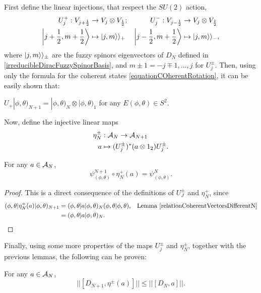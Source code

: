 First define the linear injections, that respect the $SU(2)$ action,
\begin{align*}
    U^+_j : V_{j+\frac{1}{2}} &\to V_j \otimes V_{\frac{1}{2}}; 
    & U^-_j : V_{j-\frac{1}{2}} &\to V_j \otimes V_{\frac{1}{2}} \\
    \left|j + \frac{1}{2}, m + \frac{1}{2}\right\rangle &\mapsto |j, m\rangle\rangle_+ &
    \left|j - \frac{1}{2}, m + \frac{1}{2}\right\rangle &\mapsto |j, m\rangle\rangle_-,
\end{align*} where $|j, m\rangle\rangle_\pm$ are the fuzzy spinors eigenvectors of $D_N$ defined in \ref{irreducibleDiracFuzzySpinorBasis}, and $m \pm 1 = -j \mp 1, \dots, j$ for $U_j^\pm$. 
Then, using only the formula for the coherent states \eqref{equationCOherentRotation}, it can be easily shown that:

\begin{lemma}\label{relationCoherentVectorsDifferentN}
$U_+|\phi, \theta)_{N+1} = |\phi, \theta)_N \otimes |\phi, \theta)_1$ for any $E(\phi, \theta) \in S^2$.
\end{lemma}

Now, define the injective linear maps
\begin{align*}
    \eta^\pm_N &: \mathcal A_N \to \mathcal A_{N+1} \\
    a &\mapsto (U_j^\pm)^*(a \otimes 1_2) U_j^\pm.
\end{align*}

\begin{lemma} \label{relationDifferentNCoherentStates}
For any $a \in \mathcal A_N$,
\begin{equation}
    \psi^{N+1}_{(\phi, \theta)} \circ \eta_N^+(a) = \psi^N_{(\phi, \theta)}.
\end{equation}
\end{lemma}
\begin{proof}
This is a direct consequence of the definitions of $U_J^\pm$ and $\eta_N^+$, since
\begin{align*}
    (\phi, \theta| \eta^+_N(a) |\phi, \theta)_{N+1} &= (\phi, \theta|a|\phi, \theta)_N (\phi, \theta| \phi, \theta), & \text{Lemma \ref{relationCoherentVectorsDifferentN}}\\
        &= (\phi, \theta| a | \phi, \theta)_N.
\end{align*}
\end{proof}

Finally, using some more properties of the maps $U_j^\pm$ and $\eta^\pm_N$, together with the previous lemmas, the following can be proven:
\begin{lemma}\label{normCommutatorsDiracDifferentNRelation}
For any $a \in \mathcal A_N$,
\begin{equation}
    ||[D_{N+1}, \eta^\pm(a)]|| \leq ||[D_N, a]||.
\end{equation}
\end{lemma}

